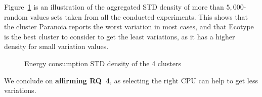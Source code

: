 Figure~\ref{fig:cpugen} is an illustration of the aggregated STD density of more than $5,000$-random values sets taken from all the conducted experiments.
This shows that the cluster \textsf{Paranoia} reports the worst variation in most cases, and that \textsf{Ecotype} is the best cluster to consider to get the least variations, as it has a higher density for small variation values.

\begin{figure}
    \caption{Energy consumption STD density of the 4 clusters}\label{fig:cpugen}
\end{figure}

\begin{mdframed}[skipabove=\topsep,skipbelow=\topsep]
    We conclude on \textbf{affirming \textsc{RQ}~4}, as selecting the right CPU can help to get less variations.
\end{mdframed}
